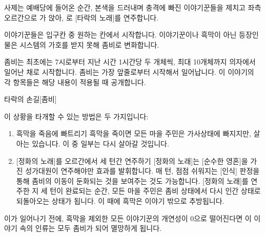 \documentclass{report}
\begin{document}
		사제는 예배당에 들어온 순간, 본색을 드러내며 충격에 빠진 이야기꾼들을 제치고 좌측 오르간으로 가 앉아, 로 [타락의 노래]를 연주합니다.
		
		이야기꾼들은 입구칸 중 원하는 칸에서 시작합니다. 이야기꾼이나 흑막이 아닌 등장인물은 시스템의 가호를 받지 못해 좀비로 변화합니다.
		
		좀비는 최초에는 7시로부터 지난 시간 1시간당 두 개체씩, 최대 10개체까지 의자에서 일어난 채로 시작합니다. 좀비는 가장 앞줄로부터 시작해서 일어납니다. 이 이야기의 각 항목들은 해당 내용이 적용될 때 공개합니다.
		
		\begin{story}{타락의 손길}{[좀비]}
			
			
		\end{story}
		
		이 상황을 타개할 수 있는 방법은 두 가지입니다:
		\begin{enumerate}
			\item 흑막을 죽음에 빠트리기
				\subitem{$\rightarrow$} 흑막을 죽이면 모든 마을 주민은 가사상태에 빠지지만, 살아는 있습니다. 이 중 일부는 다시 살아갈 것입니다.
			\item{} [정화의 노래]를 오르간에서 세 턴간 연주하기
				\subitem{$\rightarrow$} [정화의 노래]는 [순수한 영혼]을 가진 성가대원이 연주해야만 효과를 발휘합니다. 매 턴, 점점 쉬워지는 [인식] 판정을 통해 좀비의 이동이 둔화되는 것을 보여주는 것도 가능합니다. [정화의 노래]를 연주한 지 세 턴이 완료되는 순간, 모든 마을 주민은 좀비 상태에서 다시 인간 상태로 되돌아오는 상태가 됩니다. 이 때에 흑막은 이야기 밖으로 추방됩니다.
		\end{enumerate}
		
		이가 일어나기 전에, 흑막을 제외한 모든 이야기꾼의 개연성이 0으로 떨어진다면 이 이야기 속의 인류는 모두 좀비가 되어 멸망하게 됩니다.
	
\end{document}
